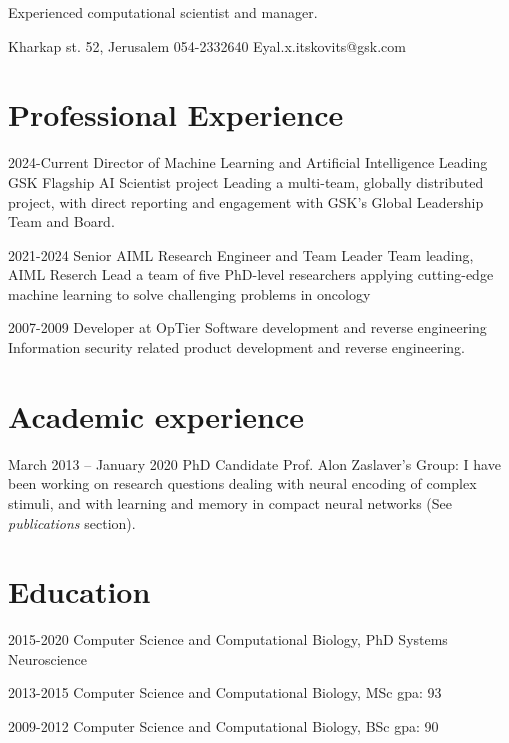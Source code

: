 \documentclass{tccv_Eyal}
\begin{document}
          {Experienced computational scientist and manager.}

\personal
    {Kharkap st. 52, Jerusalem}
    {054-2332640}
    {Eyal.x.itskovits@gsk.com}

\section{Professional Experience}
\begin{yearlistII}
\item{2024-Current}
    {Director of Machine Learning and Artificial Intelligence}
    {Leading GSK Flagship AI Scientist project}
    {Leading a multi-team, globally distributed project, with direct reporting and engagement with GSK's Global Leadership Team and Board.}
\item{2021-2024}
    {Senior AIML Research Engineer and Team Leader}
    {Team leading, AIML Reserch}
    {Lead a team of five PhD-level researchers applying cutting-edge machine learning to solve challenging problems in oncology}
\item{2007-2009}
     {Developer at OpTier}
     {Software development and reverse engineering}
     {Information security related product development and reverse engineering.}
\end{yearlistII}

\section{Academic experience}
\begin{eventlist}
\item{March 2013 -- January 2020}
     {PhD Candidate }
     {Prof. Alon Zaslaver's Group:}
I have been working on research questions dealing with neural encoding of complex stimuli, and with learning and memory in compact neural networks (See \textit{publications} section).

%

\end{eventlist}


\section{Education}
\begin{yearlist}
\item{2015-2020}
     {Computer Science and Computational Biology, PhD}
     {Systems Neuroscience}
\item{2013-2015}
     {Computer Science and Computational Biology, MSc}
     {gpa: 93}
\item{2009-2012}
     {Computer Science and Computational Biology, BSc}
     {gpa: 90}
\end{yearlist}
\end{document}
